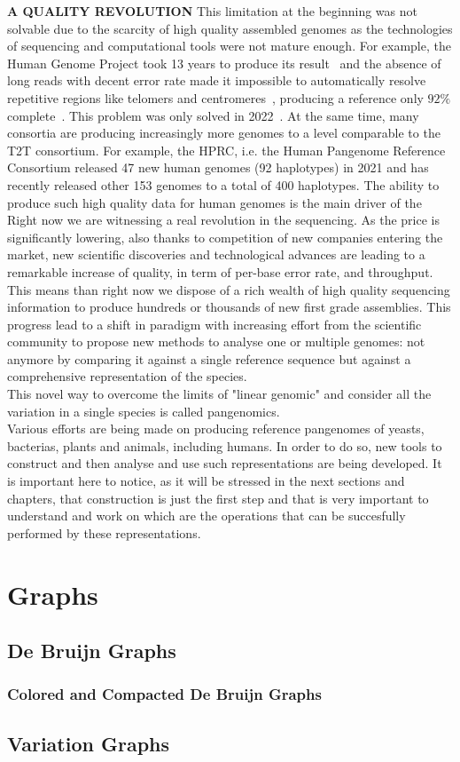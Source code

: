 \huge{\textbf{A QUALITY REVOLUTION}}
This limitation at the beginning was not solvable due to the scarcity of high quality assembled genomes as the technologies of sequencing and computational tools were not mature enough. For example, the Human Genome Project took 13 years to produce its result~\cite{humangenomeproject} and the absence of long reads with decent error rate made it impossible to automatically resolve repetitive regions like telomers and centromeres~\cite{human-pangenomics-era}, producing a reference only $92\%$ complete~\cite{t2t}. This problem was only solved in 2022~\cite{t2t}. At the same time, many consortia are producing increasingly more genomes to a level comparable to the T2T consortium. For example, the HPRC, i.e. the Human Pangenome Reference Consortium released 47 new human genomes (92 haplotypes) in 2021 and has recently released other 153 genomes to a total of 400 haplotypes. The ability to produce such high quality data for human genomes is the main driver of the \\
Right now we are witnessing a real revolution in the sequencing. As the price is significantly lowering, also thanks to competition of new companies entering the market, new scientific discoveries and technological advances are leading to a remarkable increase of quality, in term of per-base error rate, and throughput. This means than right now we dispose of a rich wealth of high quality sequencing information to produce hundreds or thousands of new first grade assemblies.
This progress lead to a shift in paradigm with increasing effort from the scientific community to propose new methods to analyse one or multiple genomes: not anymore by comparing it against a single reference sequence but against a comprehensive representation of the species. \\
This novel way to overcome the limits of "linear genomic" and consider all the variation in a single species is called pangenomics. \\
Various efforts are being made on producing reference pangenomes of yeasts, bacterias, plants and animals, including humans. In order to do so, new tools to construct and then analyse and use such representations are being developed. 
It is important here to notice, as it will be stressed in the next sections and chapters, that construction is just the first step and that is very important to understand and work on which are the operations that can be succesfully performed by these representations. \\

\section{Graphs}

\subsection{De Bruijn Graphs}
\subsubsection{Colored and Compacted De Bruijn Graphs}
\subsection{Variation Graphs}

